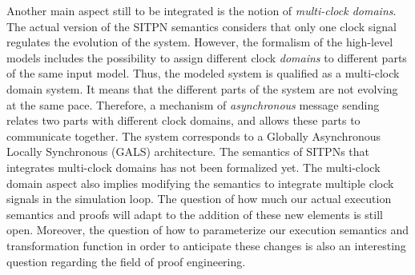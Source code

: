 \documentclass[pdflatex,sn-mathphys]{sn-jnl}%
\theoremstyle{thmstyleone}%
\theoremstyle{thmstyletwo}%
\theoremstyle{thmstylethree}%
\begin{document}



Another main aspect still to be integrated is the notion of
\textit{multi-clock domains}.  The actual version of the SITPN
semantics considers that only one clock signal regulates the evolution
of the system. However, the formalism of the \hilecop{} high-level
models includes the possibility to assign different clock
\textit{domains} to different parts of the same input model. Thus, the
modeled system is qualified as a multi-clock domain system. It means
that the different parts of the system are not evolving at the same
pace. Therefore, a mechanism of \textit{asynchronous} message sending
relates two parts with different clock domains, and allows these parts
to communicate together. The system corresponds to a Globally
Asynchronous Locally Synchronous (GALS) architecture.  The semantics
of SITPNs that integrates multi-clock domains has not been formalized
yet. The multi-clock domain aspect also implies modifying the \hvhdl{}
semantics to integrate multiple clock signals in the simulation loop.
The question of how much our actual execution semantics and proofs
will adapt to the addition of these new elements is still
open. Moreover, the question of how to parameterize our execution
semantics and transformation function in order to anticipate these
changes is also an interesting question regarding the field of proof
engineering.
\end{document}
